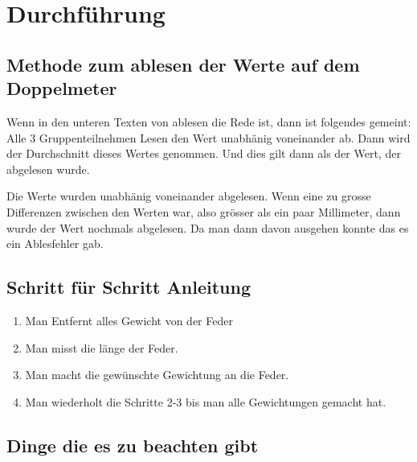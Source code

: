 \documentclass[../main.tex]{subfiles} %
\begin{document}
    \section{Durchführung}\label{sec:durchführung}
    
    \subsection{Methode zum ablesen der Werte auf dem Doppelmeter}\label{subsec:schritt-für-schritt-anleitung}

    Wenn in den unteren Texten von ablesen die Rede ist, dann ist folgendes gemeint:
    Alle 3 Gruppenteilnehmen Lesen den Wert unabhänig voneinander ab. Dann wird der Durchschnitt dieses Wertes genommen. Und dies gilt dann als der Wert, der abgelesen wurde.

    \begin{tcolorbox}[title=Hinweis beilm Ablesen]
        Die Werte wurden unabhänig voneinander abgelesen.
        Wenn eine zu grosse Differenzen zwischen den Werten war, also grösser als ein paar Millimeter, dann wurde der Wert nochmals abgelesen.
        Da man dann davon ausgehen konnte das es ein Ablesfehler gab.
    \end{tcolorbox}

    \subsection{Schritt für Schritt Anleitung}\label{subsec:schritt-für-schritt-anleitung}
    \begin{enumerate}
        \item Man Entfernt alles Gewicht von der Feder
        \item Man misst die länge der Feder.
        \item Man macht die gewünschte Gewichtung an die Feder.
        \item Man wiederholt die Schritte 2-3 bis man alle Gewichtungen gemacht hat.
    \end{enumerate}

    \subsection{Dinge die es zu beachten gibt}\label{subsec:dinge-die-es-zu-beachten-gibt}


    
\end{document}
